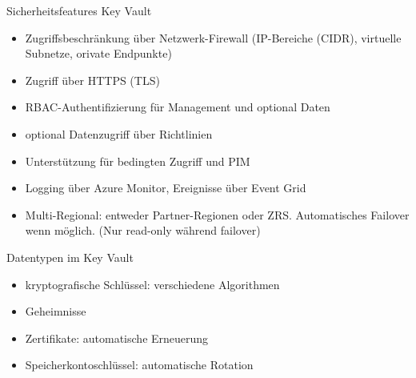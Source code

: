 \begin{flashcard}[Definition]{Sicherheitsfeatures Key Vault}
  \begin{itemize}
    \item Zugriffsbeschränkung über Netzwerk-Firewall\newline
      (IP-Bereiche (CIDR), virtuelle Subnetze, orivate Endpunkte)
    \item Zugriff über HTTPS (TLS)
    \item RBAC-Authentifizierung für Management und optional Daten
    \item optional Datenzugriff über Richtlinien
    \item Unterstützung für bedingten Zugriff und PIM
    \item Logging über Azure Monitor, Ereignisse über Event Grid
    \item Multi-Regional: entweder Partner-Regionen oder ZRS.\newline
      Automatisches Failover wenn möglich. (Nur read-only während failover)
  \end{itemize}
\end{flashcard}

\begin{flashcard}[Definition]{Datentypen im Key Vault}
  \begin{itemize}
    \item kryptografische Schlüssel: verschiedene Algorithmen
    \item Geheimnisse
    \item Zertifikate: automatische Erneuerung
    \item Speicherkontoschlüssel: automatische Rotation
  \end{itemize}
\end{flashcard}






